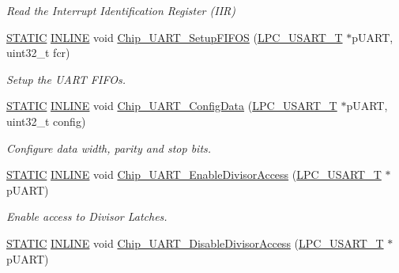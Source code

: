 \begin{DoxyCompactItemize}
\begin{DoxyCompactList}\small\item\em Read the Interrupt Identification Register (I\+IR) \end{DoxyCompactList}\item 
\hyperlink{group___l_p_c___types___public___macros_ga10b2d890d871e1489bb02b7e70d9bdfb}{S\+T\+A\+T\+IC} \hyperlink{spifi__18xx__43xx_8h_a2eb6f9e0395b47b8d5e3eeae4fe0c116}{I\+N\+L\+I\+NE} void \hyperlink{group___u_a_r_t__18_x_x__43_x_x_gac1a9d00d4f324e319e1486138b097874}{Chip\+\_\+\+U\+A\+R\+T\+\_\+\+Setup\+F\+I\+F\+OS} (\hyperlink{struct_l_p_c___u_s_a_r_t___t}{L\+P\+C\+\_\+\+U\+S\+A\+R\+T\+\_\+T} $\ast$p\+U\+A\+RT, uint32\+\_\+t fcr)
\begin{DoxyCompactList}\small\item\em Setup the U\+A\+RT F\+I\+F\+Os. \end{DoxyCompactList}\item 
\hyperlink{group___l_p_c___types___public___macros_ga10b2d890d871e1489bb02b7e70d9bdfb}{S\+T\+A\+T\+IC} \hyperlink{spifi__18xx__43xx_8h_a2eb6f9e0395b47b8d5e3eeae4fe0c116}{I\+N\+L\+I\+NE} void \hyperlink{group___u_a_r_t__18_x_x__43_x_x_ga26626229fe35e820bf2daf6a87c43155}{Chip\+\_\+\+U\+A\+R\+T\+\_\+\+Config\+Data} (\hyperlink{struct_l_p_c___u_s_a_r_t___t}{L\+P\+C\+\_\+\+U\+S\+A\+R\+T\+\_\+T} $\ast$p\+U\+A\+RT, uint32\+\_\+t config)
\begin{DoxyCompactList}\small\item\em Configure data width, parity and stop bits. \end{DoxyCompactList}\item 
\hyperlink{group___l_p_c___types___public___macros_ga10b2d890d871e1489bb02b7e70d9bdfb}{S\+T\+A\+T\+IC} \hyperlink{spifi__18xx__43xx_8h_a2eb6f9e0395b47b8d5e3eeae4fe0c116}{I\+N\+L\+I\+NE} void \hyperlink{group___u_a_r_t__18_x_x__43_x_x_ga7a8e9260541ab5cacefcacbd94725d52}{Chip\+\_\+\+U\+A\+R\+T\+\_\+\+Enable\+Divisor\+Access} (\hyperlink{struct_l_p_c___u_s_a_r_t___t}{L\+P\+C\+\_\+\+U\+S\+A\+R\+T\+\_\+T} $\ast$p\+U\+A\+RT)
\begin{DoxyCompactList}\small\item\em Enable access to Divisor Latches. \end{DoxyCompactList}\item 
\hyperlink{group___l_p_c___types___public___macros_ga10b2d890d871e1489bb02b7e70d9bdfb}{S\+T\+A\+T\+IC} \hyperlink{spifi__18xx__43xx_8h_a2eb6f9e0395b47b8d5e3eeae4fe0c116}{I\+N\+L\+I\+NE} void \hyperlink{group___u_a_r_t__18_x_x__43_x_x_ga81a3df6028c4b08dba38e4f6330d41d7}{Chip\+\_\+\+U\+A\+R\+T\+\_\+\+Disable\+Divisor\+Access} (\hyperlink{struct_l_p_c___u_s_a_r_t___t}{L\+P\+C\+\_\+\+U\+S\+A\+R\+T\+\_\+T} $\ast$p\+U\+A\+RT)

\end{DoxyCompactItemize}
